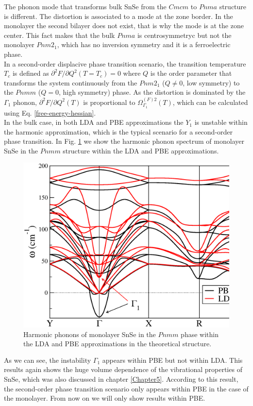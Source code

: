 The phonon mode that transforms bulk SnSe from the $Cmcm$ to $Pnma$ structure is different. The distortion is 
associated to a mode at the zone border. In the monolayer the second bilayer does not exist, that is why the mode is 
at the zone center. This fact makes that the bulk $Pnma$ is centrosymmetryc but not the monolayer $Pnm2_{1}$, which 
has no inversion symmetry and it is a ferroelectric phase. \\

In a second-order displacive phase transition scenario, the transition temperature $T_{c}$ is defined as 
$\partial^{2}F/\partial Q^{2}(T=T_{c})=0$ where $Q$ is the order parameter that transforms the system continuously 
from the $Pnm2_{1}$ ($Q\ne0$, low symmetry) to the $Pnmm$ ($Q=0$, high symmetry) phase. As the distortion is 
dominated by the $\Gamma_{1}$ phonon, $\partial^{2}F/\partial Q^{2}(T)$ is proportional to 
$\Omega^{(F)2}_{\Gamma_{1}}(T)$, which can be calculated using Eq. \ref{free-energy-hessian}. \\

In the bulk case, in both LDA and PBE approximations the $Y_{1}$ is unstable within the harmonic approximation, 
which is the typical scenario for a second-order phase transition. In Fig. \ref{harmonic-mono} we show the 
harmonic phonon spectrum of monolayer SnSe in the $Pnmm$ structure within the LDA and PBE approximations. 
\begin{figure}[h]
\includegraphics[width=\linewidth]{Figures/harmonic-mono.eps}
\caption[Harmonic phonons of monolayer SnSe.]{Harmonic phonons of monolayer SnSe in the $Pnmm$ phase within the LDA 
and PBE approximations in the theoretical structure.}
\label{harmonic-mono}
\end{figure}
As we can see, the instability $\Gamma_{1}$ appears within PBE but not within LDA. This results again shows the huge 
volume dependence of the vibrational properties of SnSe, which was also discussed in chapter \ref{Chapter5}. 
According to this result, the second-order phase transition scenario only appears within PBE in the case of the 
monolayer. From now on we will only show results within PBE. \\

